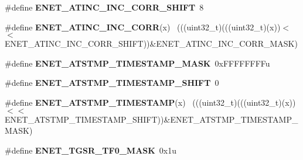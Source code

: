 \begin{DoxyCompactItemize}
\item 
\hypertarget{group___e_n_e_t___register___masks_ga804dc6e92567b82a7f104c250841d03d}{}\#define {\bfseries E\+N\+E\+T\+\_\+\+A\+T\+I\+N\+C\+\_\+\+I\+N\+C\+\_\+\+C\+O\+R\+R\+\_\+\+S\+H\+I\+F\+T}~8\label{group___e_n_e_t___register___masks_ga804dc6e92567b82a7f104c250841d03d}

\item 
\hypertarget{group___e_n_e_t___register___masks_gac493f4477ed69761337e27e41aa7a87f}{}\#define {\bfseries E\+N\+E\+T\+\_\+\+A\+T\+I\+N\+C\+\_\+\+I\+N\+C\+\_\+\+C\+O\+R\+R}(x)                                  ~(((uint32\+\_\+t)(((uint32\+\_\+t)(x))$<$$<$E\+N\+E\+T\+\_\+\+A\+T\+I\+N\+C\+\_\+\+I\+N\+C\+\_\+\+C\+O\+R\+R\+\_\+\+S\+H\+I\+F\+T))\&E\+N\+E\+T\+\_\+\+A\+T\+I\+N\+C\+\_\+\+I\+N\+C\+\_\+\+C\+O\+R\+R\+\_\+\+M\+A\+S\+K)\label{group___e_n_e_t___register___masks_gac493f4477ed69761337e27e41aa7a87f}

\item 
\hypertarget{group___e_n_e_t___register___masks_gaed2e3431a926b017dc138606295ff909}{}\#define {\bfseries E\+N\+E\+T\+\_\+\+A\+T\+S\+T\+M\+P\+\_\+\+T\+I\+M\+E\+S\+T\+A\+M\+P\+\_\+\+M\+A\+S\+K}~0x\+F\+F\+F\+F\+F\+F\+F\+Fu\label{group___e_n_e_t___register___masks_gaed2e3431a926b017dc138606295ff909}

\item 
\hypertarget{group___e_n_e_t___register___masks_ga32c08f5d3821f0f0ff1f40b4ec0de035}{}\#define {\bfseries E\+N\+E\+T\+\_\+\+A\+T\+S\+T\+M\+P\+\_\+\+T\+I\+M\+E\+S\+T\+A\+M\+P\+\_\+\+S\+H\+I\+F\+T}~0\label{group___e_n_e_t___register___masks_ga32c08f5d3821f0f0ff1f40b4ec0de035}

\item 
\hypertarget{group___e_n_e_t___register___masks_ga0bf247776377382c6f4e5a69bf5b74de}{}\#define {\bfseries E\+N\+E\+T\+\_\+\+A\+T\+S\+T\+M\+P\+\_\+\+T\+I\+M\+E\+S\+T\+A\+M\+P}(x)                              ~(((uint32\+\_\+t)(((uint32\+\_\+t)(x))$<$$<$E\+N\+E\+T\+\_\+\+A\+T\+S\+T\+M\+P\+\_\+\+T\+I\+M\+E\+S\+T\+A\+M\+P\+\_\+\+S\+H\+I\+F\+T))\&E\+N\+E\+T\+\_\+\+A\+T\+S\+T\+M\+P\+\_\+\+T\+I\+M\+E\+S\+T\+A\+M\+P\+\_\+\+M\+A\+S\+K)\label{group___e_n_e_t___register___masks_ga0bf247776377382c6f4e5a69bf5b74de}

\item 
\hypertarget{group___e_n_e_t___register___masks_gac4b5286f5096d79e0c3a286ad49cf102}{}\#define {\bfseries E\+N\+E\+T\+\_\+\+T\+G\+S\+R\+\_\+\+T\+F0\+\_\+\+M\+A\+S\+K}~0x1u\label{group___e_n_e_t___register___masks_gac4b5286f5096d79e0c3a286ad49cf102}


\end{DoxyCompactItemize}
